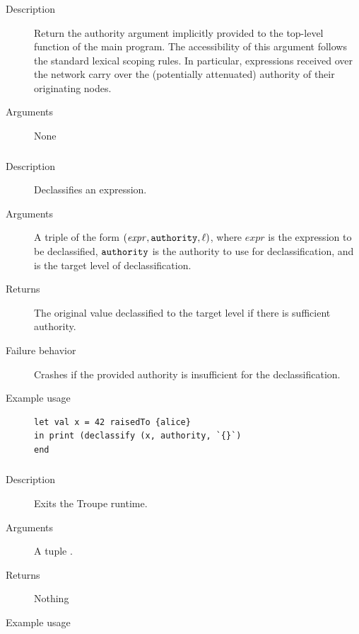 \subsubsection{}

\begin{description}
    \item [Description] Return the authority argument implicitly provided to the top-level function of the main program.
The accessibility of this argument follows the standard lexical scoping rules. In particular, expressions received over the network carry over the (potentially attenuated) authority of their originating nodes.
    \item [Arguments] None
\end{description}

\subsubsection{}
\begin{description}
    \item [Description] Declassifies an expression.
    \item [Arguments] A triple of the form $(\mathit{expr}, {\mathtt{authority}}, {\mathtt{\ell}} )$, where $\mathit{expr}$ is the expression to be declassified, ${\mathtt{authority}}$ is the authority to use for declassification, and \code{\ell} is the target level of declassification.
    \item [Returns] The original value declassified to the target level if there is sufficient authority. 
    \item [Failure behavior] Crashes if the provided authority is insufficient for the declassification.
    \item [Example usage] 
\begin{minipage}[t]{30em}
\begin{verbatim}
let val x = 42 raisedTo {alice}
in print (declassify (x, authority, `{}`)
end    
\end{verbatim}


 \end{minipage}

    
\end{description}


\subsubsection{}
\begin{description}
    \item [Description] Exits the Troupe runtime.
    \item [Arguments] A tuple .
    \item [Returns] Nothing
    \item [Example usage] 
\end{description}



